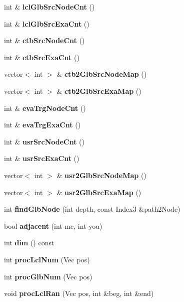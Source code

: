 \begin{CompactItemize}
int \& {\bf lcl\-Glb\-Src\-Node\-Cnt} ()
\item 
int \& {\bf lcl\-Glb\-Src\-Exa\-Cnt} ()
\item 
int \& {\bf ctb\-Src\-Node\-Cnt} ()
\item 
int \& {\bf ctb\-Src\-Exa\-Cnt} ()
\item 
vector$<$ int $>$ \& {\bf ctb2Glb\-Src\-Node\-Map} ()
\item 
vector$<$ int $>$ \& {\bf ctb2Glb\-Src\-Exa\-Map} ()
\item 
int \& {\bf eva\-Trg\-Node\-Cnt} ()
\item 
int \& {\bf eva\-Trg\-Exa\-Cnt} ()
\item 
int \& {\bf usr\-Src\-Node\-Cnt} ()
\item 
int \& {\bf usr\-Src\-Exa\-Cnt} ()
\item 
vector$<$ int $>$ \& {\bf usr2Glb\-Src\-Node\-Map} ()
\item 
vector$<$ int $>$ \& {\bf usr2Glb\-Src\-Exa\-Map} ()
\item 
int {\bf find\-Glb\-Node} (int depth, const Index3 \&path2Node)
\item 
bool {\bf adjacent} (int me, int you)
\item 
int {\bf dim} () const 
\item 
int {\bf proc\-Lcl\-Num} (Vec pos)
\item 
int {\bf proc\-Glb\-Num} (Vec pos)
\item 
void {\bf proc\-Lcl\-Ran} (Vec pos, int \&beg, int \&end)
\end{CompactItemize}
